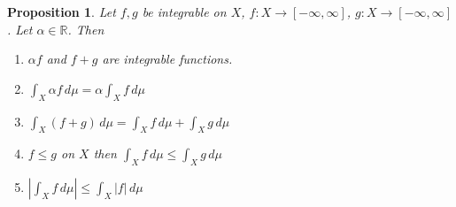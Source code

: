 \documentclass{article}
\newtheorem{proposition}{Proposition}  \numberwithin{proposition}{section}
\newcommand{\card}[1]{\left|#1\right|}
\begin{document}
\begin{proposition} %
  Let $f, g$ be integrable on $X$, $f: X \to [-\infty, \infty]$, $g: X \to [-\infty, \infty]$.
  Let $\alpha \in \mathbb R$. Then
  \begin{enumerate}
    \item $\alpha f$ and $f + g$ are integrable functions.
    \item $\int_X \alpha f \, d\mu = \alpha \int_X f \, d\mu$
    \item $\int_X (f + g) \, d\mu = \int_X f \, d\mu + \int_X g \, d\mu$
    \item $f \leq g$ on $X$ then $\int_X f \, d\mu \leq \int_X g \, d\mu$
    \item $\card{\int_X f \, d\mu} \leq \int_X \card{f} \, d\mu$
  \end{enumerate}
\end{proposition}
\end{document}
